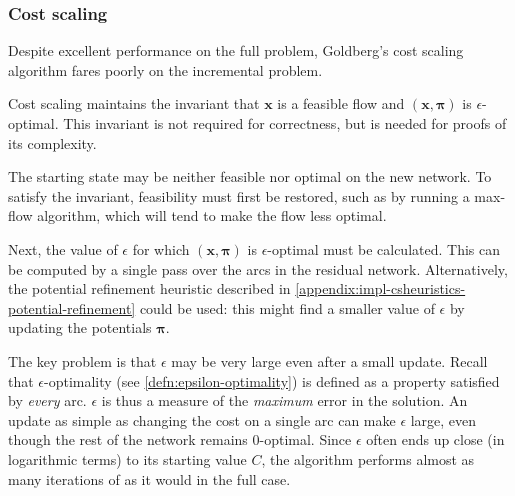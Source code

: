 \subsubsection{Cost scaling} 
Despite excellent performance on the full problem, Goldberg's cost scaling algorithm fares poorly on the incremental problem. 

Cost scaling maintains the invariant that $\mathbf{x}$ is a feasible flow and $\left(\mathbf{x},\boldsymbol{\pi}\right)$ is $\epsilon$-optimal. This invariant is not required for correctness, but is needed for proofs of its complexity.

The starting state may be neither feasible nor optimal on the new network. To satisfy the invariant, feasibility must first be restored, such as by running a max-flow algorithm\footnotemark, which will tend to make the flow less optimal.

Next, the value of $\epsilon$ for which $\left(\mathbf{x},\boldsymbol{\pi}\right)$ is $\epsilon$-optimal must be calculated. This can be computed by a single pass over the arcs in the residual network. Alternatively, the potential refinement heuristic described in \cref{appendix:impl-csheuristics-potential-refinement} could be used: this might find a smaller value of $\epsilon$ by updating the potentials $\boldsymbol{\pi}$.

The key problem is that $\epsilon$ may be very large even after a small update. Recall that $\epsilon$-optimality (see \cref{defn:epsilon-optimality}) is defined as a property satisfied by \emph{every} arc. $\epsilon$ is thus a measure of the \emph{maximum} error in the solution. An update as simple as changing the cost on a single arc can make $\epsilon$ large, even though the rest of the network remains $0$-optimal. Since $\epsilon$ often ends up close (in logarithmic terms) to its starting value $C$, the algorithm performs almost as many iterations of  as it would in the full case.

